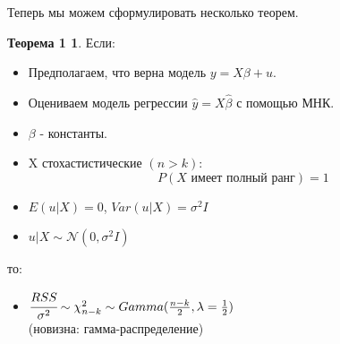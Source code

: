 \documentclass[12pt]{article} %
\theoremstyle{definition} %
\def \hb{\hat{\beta}}
\def \hy{\hat{y}}
\def \cN{\mathcal{N}}
\def \cChi{\mathcal{\chi}}
\begin{document}
Теперь мы можем сформулировать несколько теорем.

\newtheorem*{theo_n}{Теорема 1}
\begin{theo_n}
    
    Если:
    \begin{itemize}
        \item \text{[ТГМ1] } Предполагаем, что верна модель $y=X\beta+u$.
        \item \text{[ТГМ2] } Оцениваем модель регрессии $\hy = X\hb$ с помощью МНК.
        \item \text{[ТГМ3] } $\beta$ - константы.
        \item \text{[ТГМ4] } X стохастистические $(n>k)$:
            \[
                P(X \text{ имеет полный ранг}) = 1
            \]
        \item \text{[ТГМ5] } $E(u|X)=0$, $Var(u|X)=\sigma^2I$
        \item \text{[нормальность] }  $u|X \sim \cN(0, \sigma^2I)$
    \end{itemize}
    
    то:
    \begin{itemize}
        \item $\cfrac{RSS}{\sigma^2} \sim \cChi_{n-k}^2 \sim Gamma(\frac{n-k}{2}, \lambda=\frac{1}{2})$ \\
        (новизна: гамма-распределение)
    \end{itemize}
    
\end{theo_n}
\end{document}
